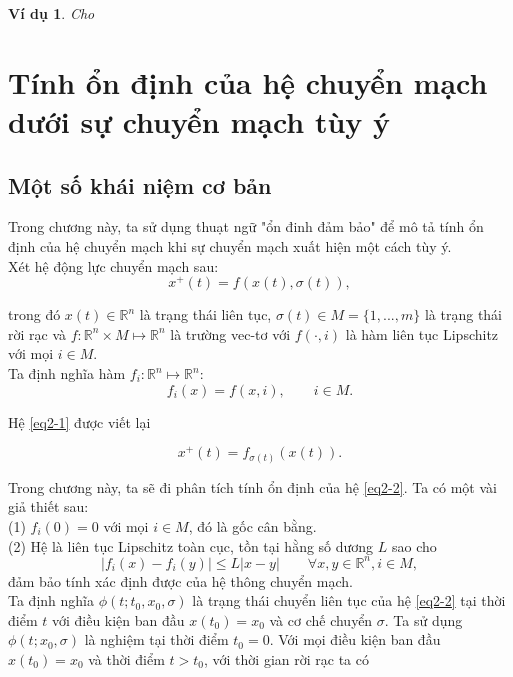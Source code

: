 \documentclass[14pt,a4paper,oneside]{report}		%
\newtheorem{example}[theorem]{Ví dụ}
\begin{document}
\begin{example}
Cho 
\end{example}

\chapter{Tính ổn định của hệ chuyển mạch dưới sự chuyển mạch tùy ý}
\section{Một số khái niệm cơ bản}
Trong chương này, ta sử dụng thuạt ngữ "ổn đinh đảm bảo" để mô tả tính ổn định của hệ chuyển mạch khi sự chuyển mạch xuất hiện một cách tùy ý.\\

Xét hệ động lực chuyển mạch sau:
\begin{equation} \label{eq2-1}
x^+(t)=f(x(t),\sigma (t)),
\end{equation}

trong đó $x(t)\in\mathbb{R}^n$ là trạng thái liên tục, $\sigma (t)\in M = \{1,...,m\}$ là trạng thái rời rạc và $f : \mathbb{R}^n \times M \mapsto \mathbb{R}^n$ là trường vec-tơ với $f(\cdot ,i)$ là hàm liên tục Lipschitz với mọi $i\in M$.\\

Ta định nghĩa hàm $f_i : \mathbb{R}^n \mapsto \mathbb{R}^n$:
$$f_i(x)=f(x,i), \qquad i\in M.$$

Hệ \ref{eq2-1} được viết lại

\begin{equation} \label{eq2-2}
x^+(t)=f_{\sigma (t)}(x(t)).
\end{equation}

Trong chương này, ta sẽ đi phân tích tính ổn định của hệ \ref{eq2-2}. Ta có một vài giả thiết sau:\\
(1) $f_i(0)=0$ với mọi $i\in M$, đó là gốc cân bằng.\\
(2) Hệ là liên tục Lipschitz toàn cục, tồn tại hằng số dương $L$ sao cho
\begin{equation} \label{eq2-3}
|f_i(x)-f_i(y)|\leq L|x-y|\qquad \forall x,y \in \mathbb{R}^n, i\in M,
\end{equation}
đảm bảo tính xác định được của hệ thông chuyển mạch.\\
Ta định nghĩa $\phi (t;t_0,x_0,\sigma)$ là trạng thái chuyển liên tục của hệ \ref{eq2-2} tại thời điểm $t$ với điều kiện ban đầu $x(t_0)=x_0$ và cơ chế chuyển $\sigma$. Ta sử dụng $\phi (t;x_0,\sigma)$ là nghiệm tại thời điểm $t_0 = 0$. Với mọi điều kiện ban đầu $x(t_0)=x_0$ và thời điểm $t>t_0$, với thời gian rời rạc ta có
\end{document}
